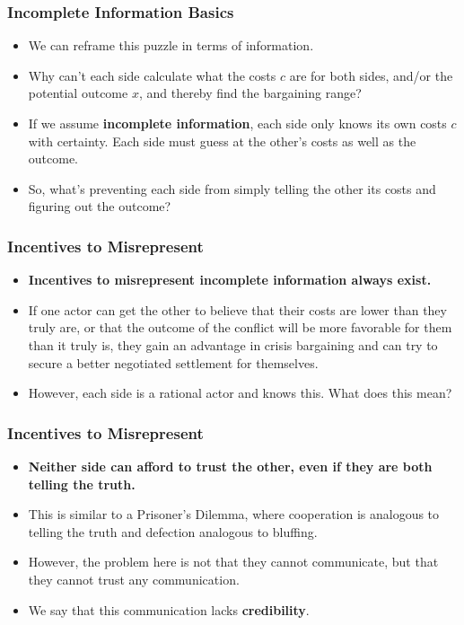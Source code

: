 \documentclass[handout]{beamer}
\begin{document}
\begin{frame} 
	\frametitle{\LARGE{Incomplete Information Basics}}
	\begin{itemize}
		\item We can reframe this puzzle in terms of information. \pause
		\item Why can't each side calculate what the costs $c$ are for both sides, and/or the potential outcome $x$, and thereby find the bargaining range? \pause
		\item If we assume \textbf{incomplete information}, each side only knows its own costs $c$ with certainty. Each side must guess at the other's costs as well as the outcome. \pause
		\item So, what's preventing each side from simply telling the other its costs and figuring out the outcome?
	\end{itemize}
\end{frame}

\begin{frame} 
	\frametitle{\LARGE{Incentives to Misrepresent}}
	\begin{itemize}
		\item \textbf{Incentives to misrepresent incomplete information always exist.} \pause
		\item If one actor can get the other to believe that their costs are lower than they truly are, or that the outcome of the conflict will be more favorable for them than it truly is, they gain an advantage in crisis bargaining and can try to secure a better negotiated settlement for themselves. \pause
		\item However, each side is a rational actor and knows this. What does this mean?		
	\end{itemize}
\end{frame}

\begin{frame} 
	\frametitle{\LARGE{Incentives to Misrepresent}}
	\begin{itemize}
		\item \textbf{Neither side can afford to trust the other, even if they are both telling the truth.} \pause
		\item This is similar to a Prisoner's Dilemma, where cooperation is analogous to telling the truth and defection analogous to bluffing. \pause
		\item However, the problem here is not that they cannot communicate, but that they cannot trust any communication.	 \pause
		\item We say that this communication lacks \textbf{credibility}.
	\end{itemize}
\end{frame}
\end{document}
